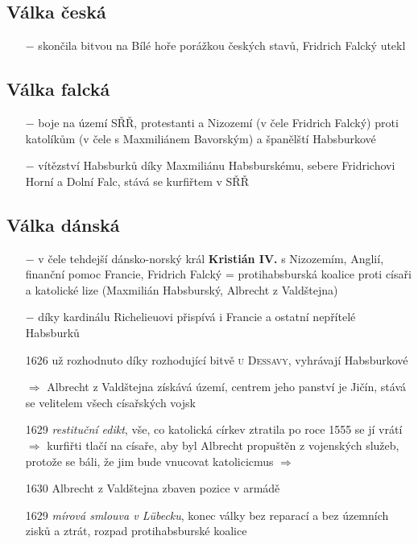 \documentclass{article}
\begin{document}
\subsection*{Válka česká}
\begin{itemize}
    \vspace{-0.5em}
    \setlength\itemsep{0.15em}
    \item[$-$] skončila bitvou na Bílé hoře porážkou českých stavů, Fridrich Falcký utekl
\end{itemize}

\subsection*{Válka falcká}
\begin{itemize}
    \vspace{-0.5em}
    \setlength\itemsep{0.15em}
    \item[$-$] boje na území SŘŘ, protestanti a Nizozemí (v čele Fridrich Falcký) proti katolíkům (v čele s Maxmiliánem Bavorským) a španělští Habsburkové
    \item[$-$] vítězství Habsburků díky Maxmiliánu Habsburskému, sebere Fridrichovi Horní a Dolní Falc, stává se kurfiřtem v SŘŘ
\end{itemize}


\subsection*{Válka dánská}
\begin{itemize}
    \vspace{-0.5em}
    \setlength\itemsep{0.15em}
    \item[$-$] v čele tehdejší dánsko-norský král \textbf{Kristián IV.} s Nizozemím, Anglií, finanční pomoc Francie, Fridrich Falcký = protihabsburská koalice proti císaři a katolické lize (Maxmilián Habsburský, Albrecht z Valdštejna)
    \item[$-$] díky kardinálu Richelieuovi přispívá i Francie a ostatní nepřítelé Habsburků
    \item[1626] už rozhodnuto díky rozhodující bitvě \textsc{u Dessavy}, vyhrávají Habsburkové
    \item[$\Rightarrow$ ] Albrecht z Valdštejna získává území, centrem jeho panství je Jičín, stává se velitelem všech císařských vojsk
    \item[1629] \textit{restituční edikt}, vše, co katolická církev ztratila po roce 1555 se jí vrátí $\Rightarrow$ kurfiřti tlačí na císaře, aby byl Albrecht propuštěn z vojenských služeb, protože se báli, že jim bude vnucovat katolicicmus $\Rightarrow$
    \item[1630] Albrecht z Valdštejna zbaven pozice v armádě
    \item[1629] \textit{mírová smlouva v Lübecku}, konec války bez reparací a bez územních zisků a ztrát, rozpad protihabsburské koalice

\end{itemize}
\end{document}
